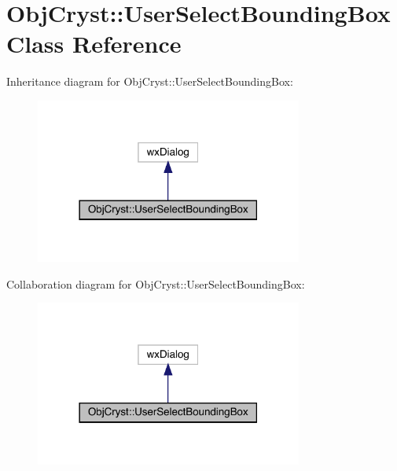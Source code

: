 \hypertarget{class_obj_cryst_1_1_user_select_bounding_box}{}\section{Obj\+Cryst\+::User\+Select\+Bounding\+Box Class Reference}
\label{class_obj_cryst_1_1_user_select_bounding_box}


Inheritance diagram for Obj\+Cryst\+::User\+Select\+Bounding\+Box\+:
\nopagebreak
\begin{figure}[H]
\begin{center}
\leavevmode
\includegraphics[width=249pt]{class_obj_cryst_1_1_user_select_bounding_box__inherit__graph}
\end{center}
\end{figure}


Collaboration diagram for Obj\+Cryst\+::User\+Select\+Bounding\+Box\+:
\nopagebreak
\begin{figure}[H]
\begin{center}
\leavevmode
\includegraphics[width=249pt]{class_obj_cryst_1_1_user_select_bounding_box__coll__graph}
\end{center}
\end{figure}
